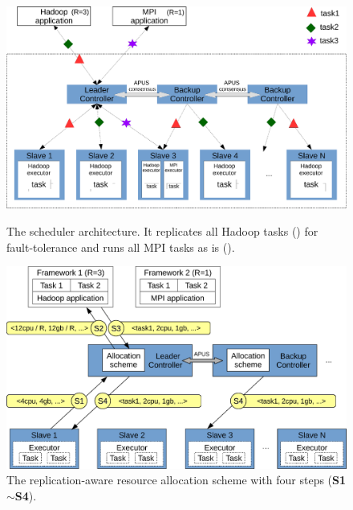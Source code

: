 \vspace{.1in}
\begin{figure}[!htb]
    \begin{minipage}{.48\textwidth}
        \vspace{-.1in}
        \includegraphics[width=0.34\textheight]{figures/scheduler_arch.eps}
         \vspace{-.05in}
        \caption{The \tripod scheduler architecture. It replicates all Hadoop 
tasks () for fault-tolerance and runs all MPI tasks as is ().}
        \label{fig:scheduler-arch}
    \end{minipage}
    \hspace{0.15in}
    \begin{minipage}{0.48\textwidth}
        \vspace{-.27in}
        \includegraphics[width=0.34\textheight]{figures/scheduler_flow.eps}
        \vspace{-.05in}
        \caption{The replication-aware resource allocation scheme with four 
steps (\textbf{S1}$\sim$\textbf{S4}).}
        \label{fig:scheduler-workflow}
    \end{minipage}
\end{figure}

